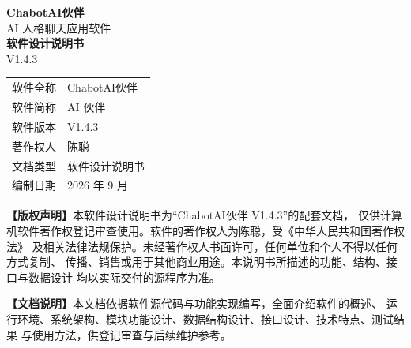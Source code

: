 \documentclass[zihao=5,a4paper]{ctexart}
\begin{document}
\begin{titlepage}
  \centering
  \vspace*{1.6cm}
  {\Huge\bfseries ChabotAI伙伴}\\[0.6cm]
  {\Large AI 人格聊天应用软件}\\[1.2cm]
  {\huge\bfseries 软件设计说明书}\\[0.4cm]
  {\large V1.4.3}\\[1.6cm]

  \begin{tabular}{r@{\quad}l}
    \toprule
    软件全称 & ChabotAI伙伴 \\
    软件简称 & AI 伙伴 \\
    软件版本 & V1.4.3 \\
    著作权人 & 陈聪 \\
    文档类型 & 软件设计说明书 \\
    编制日期 & 2026 年 9 月 \\
    \bottomrule
  \end{tabular}

  \vspace{1.6cm}
  \begin{minipage}{0.86\textwidth}
    \textbf{【版权声明】}本软件设计说明书为“ChabotAI伙伴 V1.4.3”的配套文档，
    仅供计算机软件著作权登记审查使用。软件的著作权人为陈聪，受《中华人民共和国著作权法》
    及相关法律法规保护。未经著作权人书面许可，任何单位和个人不得以任何方式复制、
    传播、销售或用于其他商业用途。本说明书所描述的功能、结构、接口与数据设计
    均以实际交付的源程序为准。
  \end{minipage}

  \vspace{1.2cm}
  \begin{minipage}{0.86\textwidth}
    \textbf{【文档说明】}本文档依据软件源代码与功能实现编写，全面介绍软件的概述、
    运行环境、系统架构、模块功能设计、数据结构设计、接口设计、技术特点、测试结果
    与使用方法，供登记审查与后续维护参考。
  \end{minipage}

  \vfill
  \vspace*{0.8cm}
\end{titlepage}

\begingroup
{}
\tableofcontents
\endgroup

\vspace{0.5em}

\end{document}

